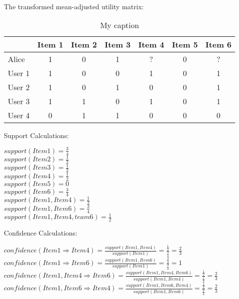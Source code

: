 \documentclass[DIN, pagenumber=false, fontsize=12pt, parskip=half]{scrartcl}
\begin{document}
The transformed mean-adjusted utility matrix:\\
\begin{table}[htb]
\centering
\caption{My caption}
\label{my-label}
\begin{tabular}{lcccccc}
\hline
       & Item 1 & Item 2 & Item 3 & Item 4 & Item 5 & Item 6 \\ \hline
Alice  & 1      & 0      & 1      & ?      & 0      & ?      \\
User 1 & 1      & 0      & 0      & 1      & 0      & 1      \\
User 2 & 1      & 0      & 1      & 0      & 0      & 1      \\
User 3 & 1      & 1      & 0      & 1      & 0      & 1      \\
User 4 & 0      & 1      & 1      & 0      & 0      & 0     \\ \hline
\end{tabular}
\end{table}

Support Calculations:\\
\begin{center}
$	support ( Item 1 ) = \frac {3}{4}$\\ 
$	support ( Item 2 ) = \frac {1}{2}$\\
$	support ( Item 3 ) = \frac {1}{2} $\\
$	support ( Item 4 ) = \frac {1}{2}$\\
$	support ( Item 5 ) = 0$\\
$	support ( Item 6 ) = \frac {3}{4}$\\
$	support ( Item 1 , Item 4) = \frac {1}{2}$\\
$	support ( Item 1 , Item 6) =\frac {3}{4} $\\
$	support ( Item 1 , Item 4, team 6) =\frac {1}{2} $\\
\end{center}
Confidence Calculations:\\
\begin{center}
$	confidence (Item 1\Rightarrow Item 4) = \frac {support ( Item 1 , Item 4)}{support ( Item 1)} = \frac {\frac{1}{2}}{\frac {3}{4}}=\frac {2}{3}$\\
$	confidence (Item 1\Rightarrow Item 6) = \frac {support ( Item 1 , Item 6)}{support ( Item 1)} = \frac {\frac{3}{4}}{\frac {3}{4}}=1$\\
$	confidence (Item 1, Item 4 \Rightarrow Item 6) = \frac {support ( Item 1 , Item 4, Item 6)}{support ( Item 1 , Item 4)} = \frac {\frac{1}{2}}{\frac {1}{2}}=\frac {2}{3}$\\
$	confidence (Item 1, Item 6\Rightarrow Item 4) = \frac {support ( Item 1 , Item 6, Item 4)}{support ( Item 1 , Item 6)} = \frac {\frac{1}{2}}{\frac {3}{4}}=\frac {2}{3}$\\
\end{center}
\end{document}
